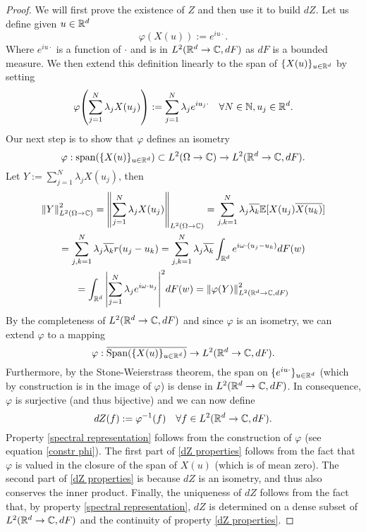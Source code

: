 \documentclass[12pt]{article}
\begin{document}
\begin{proof}
	We will first prove the existence of $Z$ and then use it to build $dZ$. Let us define given $u\in{\mathbb R}^d$
	\begin{equation}\label{constr phi}
		\varphi(X(u)):=e^{iu\cdot}.
	\end{equation}
	Where $e^{iu\cdot}$ is a function of $\cdot$ and is in $L^2({\mathbb R}^d\to\mathbb{C},dF)$ as $dF$ is a bounded measure. We then extend this definition linearly to the span of $\{X(u)\}_{u\in{\mathbb R}^d}$ by setting
	\begin{equation*}
		\varphi\qty(\sum_{j=1}^N\lambda_j X(u_j)):=\sum_{j=1}^N\lambda_j e^{iu_j\cdot}\quad\forall N\in \mathbb{N},u_j\in{\mathbb R}^d.
	\end{equation*}
	Our next step is to show that $\varphi$ defines an isometry $$\varphi:\text{span}(\{X(u)\}_{u\in{\mathbb R}^d})\subset L^2(\Omega\to\mathbb{C})\to L^2({\mathbb R}^d\to\mathbb{C},dF).$$
	Let $Y:=\sum_{j=1}^N\lambda_j X(u_j)$, then
	\begin{multline*}
		\norm{Y}_{L^2(\Omega\to\mathbb{C})}^2=\norm{\sum_{j=1}^N\lambda_j X(u_j)}_{L^2(\Omega\to\mathbb{C})}=\sum_{j,k=1}^N\lambda_j\overline{\lambda_k} \mathbb{E}[X(u_j)\overline{X(u_k)}]\\=\sum_{j,k=1}^N\lambda_j\overline{\lambda_k} r(u_j-u_k)
		=\sum_{j,k=1}^N\lambda_j\overline{\lambda_k} \int_{{\mathbb R}^d}e^{i\omega\cdot(u_j-u_k)}dF(w) \\= \int_{{\mathbb R}^d}\abs{\sum_{j=1}^N\lambda_je^{i\omega\cdot u_j}}^2dF(w)=\norm{\varphi(Y)}_{L^2({\mathbb R}^d\to\mathbb{C},dF)}^2
	\end{multline*}
	By the completeness of $L^2({\mathbb R}^d\to\mathbb{C}, dF)$ and since $\varphi$ is an isometry, we can extend $\varphi$ to a mapping
	$$\varphi:\overline{\text{Span}(\{X(u)\}_{u\in{\mathbb R}^d})}\to L^2({\mathbb R}^d\to\mathbb{C},dF).$$ Furthermore, by the Stone-Weierstrass theorem, the span on $\{e^{iu\cdot}\}_{u\in{\mathbb R}^d}$ (which by construction is in the image of $\varphi$) is dense in $L^2({\mathbb R}^d\to\mathbb{C},dF)$. In consequence,  $\varphi$ is surjective (and thus bijective) and we can now define
	\begin{equation*}
		dZ(f):=\varphi^{-1}(f)\quad\forall f\in L^2({\mathbb R}^d\to\mathbb{C},dF).
	\end{equation*}
	Property \eqref{spectral representation} follows from the construction of $\varphi$ (see equation \eqref{constr phi}). The first part of \eqref{dZ properties} follows from the fact that $\varphi$ is valued in the closure of the span of $X(u)$ (which is of mean zero). The second part of \eqref{dZ properties} is because $dZ$ is an isometry, and thus also conserves the inner product. Finally, the uniqueness of $dZ$ follows from the fact that, by property \eqref{spectral representation}, $dZ$ is determined on a dense subset of $L^2({\mathbb R}^d\to\mathbb{C},dF)$ and the continuity of property \eqref{dZ properties}.
\end{proof}
\end{document}
